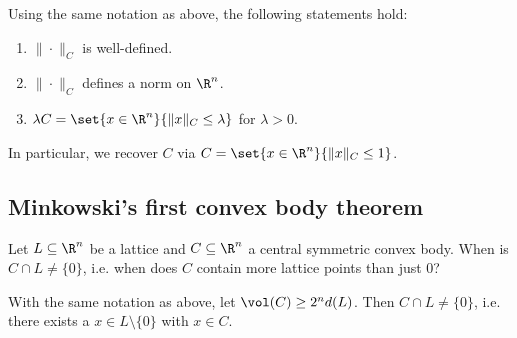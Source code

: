 \begin{lem}
	Using the same notation as above, the following statements hold:
	\begin{enumerate}
		\item \( \| \cdot \|_C \) is well-defined.
		\item \( \| \cdot \|_C \) defines a norm on \( \R^n \).
		\item \( \lambda C = \set{x \in \R^n}{\|x\|_C \leq \lambda} \) for \( \lambda > 0 \).
	\end{enumerate}
	In particular, we recover \( C \) via \( C = \set{x \in \R^n}{\|x\|_C \leq 1} \).
\end{lem}

\subsection*{Minkowski's first convex body theorem}

Let \( L \subseteq \R^n \) be a lattice and \( C \subseteq \R^n \) a central symmetric convex body.
When is \( C \cap L \neq \{0\} \), i.e. when does \( C \) contain more lattice points than just \( 0 \)?

\begin{thm}
	With the same notation as above, let \( \vol(C) \geq 2^n d(L) \).
	Then \( C \cap L \neq \{0\} \), i.e. there exists a \( x \in L \setminus \{0\} \) with \( x \in C \).
\end{thm}